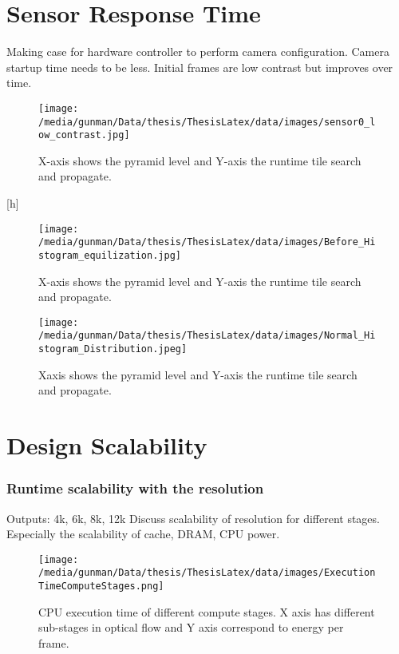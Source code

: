 \section{Sensor Response Time}
Making case for hardware controller to perform camera configuration. 
Camera startup time needs to be less. 
	Initial frames are low contrast but improves over time. 
	\begin{figure}[h]
		\begin{center}
			\texttt{[image: /media/gunman/Data/thesis/ThesisLatex/data/images/sensor0\_low\_contrast.jpg]}
			\caption{X-axis shows the pyramid level and Y-axis the runtime tile search and propagate.}
			\label{fig:ex_4_9}
		\end{center}
		\vspace{-0.3in}
	\end{figure}[h]

	\begin{figure*}
	\begin{center}
		\texttt{[image: /media/gunman/Data/thesis/ThesisLatex/data/images/Before\_Histogram\_equilization.jpg]}
		\caption{X-axis shows the pyramid level and Y-axis the runtime tile search and propagate.}
		\label{fig:ex_4_9}
	\end{center}
	\vspace{-0.3in}
\end{figure*} 

	\begin{figure*}
	\begin{center}
		\texttt{[image: /media/gunman/Data/thesis/ThesisLatex/data/images/Normal\_Histogram\_Distribution.jpeg]}
		\caption{Xaxis shows the pyramid level and Y-axis the runtime tile search and propagate.}
		\label{fig:ex_4_9}
	\end{center}
	\vspace{-0.3in}
\end{figure*} 


\section{Design Scalability}	

\subsubsection{Runtime scalability with the resolution}
Outputs:
4k, 6k, 8k, 12k
Discuss scalability of resolution for different stages. \newline
Especially the scalability of cache, DRAM, CPU power. 
\begin{figure*}
	\begin{center}
		\texttt{[image: /media/gunman/Data/thesis/ThesisLatex/data/images/ExecutionTimeComputeStages.png]}
		\caption{CPU execution time of different compute stages. X axis has different sub-stages in optical flow and Y axis correspond to energy per frame.}
		\label{fig:ex_4_9}
	\end{center}
	\vspace{-0.3in}
\end{figure*} 

